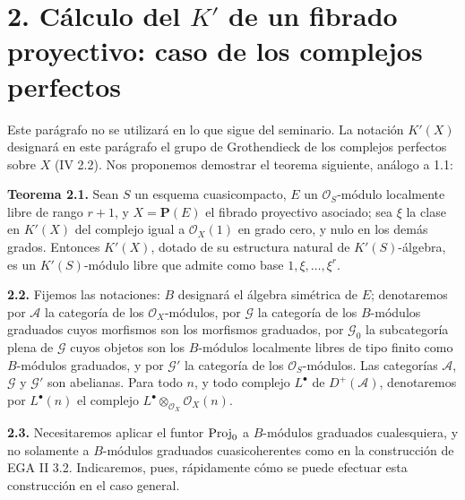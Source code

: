 \providecommand{\sisi}[2]{#2}

\section*{2. Cálculo del \(K'\) de un fibrado proyectivo: caso de los complejos perfectos}


Este parágrafo no se utilizará en lo que sigue del seminario. La notación \(K'(X)\) designará en este parágrafo el grupo de Grothendieck de los complejos perfectos sobre \(X\) (IV 2.2). Nos proponemos demostrar el teorema siguiente, análogo a 1.1:

\textbf{Teorema 2.1.} Sean \(S\) un esquema cuasicompacto, \(E\) un \(\mathcal O_S\)-módulo localmente libre de rango \(r+1\), y \(X=\mathbf P(E)\) el fibrado proyectivo asociado; sea \(\xi\) la clase en \(K'(X)\) del complejo igual a \(\mathcal O_X(1)\) en grado cero, y nulo en los demás grados. Entonces \(K'(X)\), dotado de su estructura natural de \(K'(S)\)-álgebra, es un \(K'(S)\)-módulo libre que admite como base \(1,\xi,\ldots,\xi^r\).

\textbf{2.2.} Fijemos las notaciones: \(B\) designará el álgebra simétrica de \(E\); denotaremos por \(\mathcal A\) la categoría de los \(\mathcal O_X\)-módulos, por \(\mathcal G\) la categoría de los \(B\)-módulos graduados cuyos morfismos son los morfismos graduados, por \(\mathcal G_0\) la subcategoría plena de \(\mathcal G\) cuyos objetos son los \(B\)-módulos localmente libres de tipo finito como \(B\)-módulos graduados, y por \(\mathcal G'\) la categoría de los \(\mathcal O_S\)-módulos. Las categorías \(\mathcal A\), \(\mathcal G\) y \(\mathcal G'\) son abelianas. Para todo \(n\), y todo complejo \(L^\bullet\) de \(D^+(\mathcal A)\), denotaremos por \(L^\bullet(n)\) el complejo \(L^\bullet\otimes_{\mathcal O_X}\mathcal O_X(n)\).

\textbf{2.3.} Necesitaremos aplicar el funtor \(\operatorname{Proj}_0\) a \(B\)-módulos graduados cualesquiera, y no solamente a \(B\)-módulos graduados cuasicoherentes como en la construcción de EGA II 3.2. Indicaremos, pues, rápidamente cómo se puede efectuar esta construcción en el caso general.

